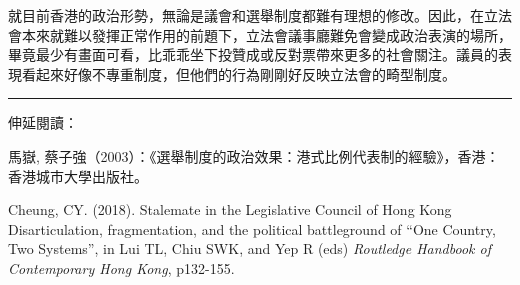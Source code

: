 就目前香港的政治形勢，無論是議會和選舉制度都難有理想的修改。因此，在立法會本來就難以發揮正常作用的前題下，立法會議事廳難免會變成政治表演的場所，畢竟最少有畫面可看，比乖乖坐下投贊成或反對票帶來更多的社會關注。議員的表現看起來好像不專重制度，但他們的行為剛剛好反映立法會的畸型制度。

\rule[-10pt]{15cm}{0.05em}

伸延閱讀：

馬嶽, 蔡子強（2003）：《選舉制度的政治效果：港式比例代表制的經驗》，香港：香港城市大學出版社。

Cheung, CY. (2018). Stalemate in the Legislative Council of Hong Kong Disarticulation, fragmentation, and the political battleground of “One Country, Two Systems”, in Lui TL, Chiu SWK, and Yep R (eds) \textit{Routledge Handbook of Contemporary Hong Kong}, p132-155.